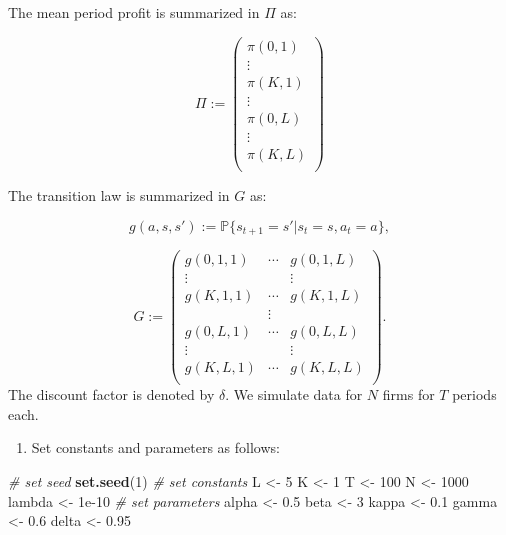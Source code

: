 \documentclass[]{book}
\newenvironment{Shaded}{\begin{snugshade}}{\end{snugshade}}
\newcommand{\KeywordTok}[1]{\textcolor[rgb]{0.13,0.29,0.53}{\textbf{#1}}}
\newcommand{\DecValTok}[1]{\textcolor[rgb]{0.00,0.00,0.81}{#1}}
\newcommand{\FloatTok}[1]{\textcolor[rgb]{0.00,0.00,0.81}{#1}}
\newcommand{\StringTok}[1]{\textcolor[rgb]{0.31,0.60,0.02}{#1}}
\newcommand{\CommentTok}[1]{\textcolor[rgb]{0.56,0.35,0.01}{\textit{#1}}}
\newcommand{\NormalTok}[1]{#1}
\providecommand{\tightlist}{%
  \setlength{\itemsep}{0pt}\setlength{\parskip}{0pt}}
\begin{document}
The mean period profit is summarized in \(\Pi\) as:

\[
\Pi :=
\begin{pmatrix}
\pi(0, 1)\\
\vdots\\
\pi(K, 1)\\
\vdots \\
\pi(0, L)\\
\vdots\\
\pi(K, L)\\
\end{pmatrix}
\]

The transition law is summarized in \(G\) as:

\[
g(a, s, s') := \mathbb{P}\{s_{t + 1} = s'|s_t = s, a_t = a\},
\]

\[
G := 
\begin{pmatrix}
g(0, 1, 1) & \cdots & g(0, 1, L)\\
\vdots & & \vdots \\
g(K, 1, 1) & \cdots & g(K, 1, L)\\
& \vdots & \\
g(0, L, 1) & \cdots & g(0, L, L)\\
\vdots & & \vdots \\
g(K, L, 1) & \cdots & g(K, L, L)\\
\end{pmatrix}.
\] The discount factor is denoted by \(\delta\). We simulate data for
\(N\) firms for \(T\) periods each.

\begin{enumerate}
\def\labelenumi{\arabic{enumi}.}
\tightlist
\item
  Set constants and parameters as follows:
\end{enumerate}

\begin{Shaded}
\begin{Highlighting}[]
\CommentTok{# set seed}
\KeywordTok{set.seed}\NormalTok{(}\DecValTok{1}\NormalTok{)}
\CommentTok{# set constants }
\NormalTok{L <-}\StringTok{ }\DecValTok{5}
\NormalTok{K <-}\StringTok{ }\DecValTok{1}
\NormalTok{T <-}\StringTok{ }\DecValTok{100}
\NormalTok{N <-}\StringTok{ }\DecValTok{1000}
\NormalTok{lambda <-}\StringTok{ }\FloatTok{1e-10}
\CommentTok{# set parameters}
\NormalTok{alpha <-}\StringTok{ }\FloatTok{0.5}
\NormalTok{beta <-}\StringTok{ }\DecValTok{3}
\NormalTok{kappa <-}\StringTok{ }\FloatTok{0.1}
\NormalTok{gamma <-}\StringTok{ }\FloatTok{0.6}
\NormalTok{delta <-}\StringTok{ }\FloatTok{0.95}
\end{Highlighting}
\end{Shaded}
\end{document}
